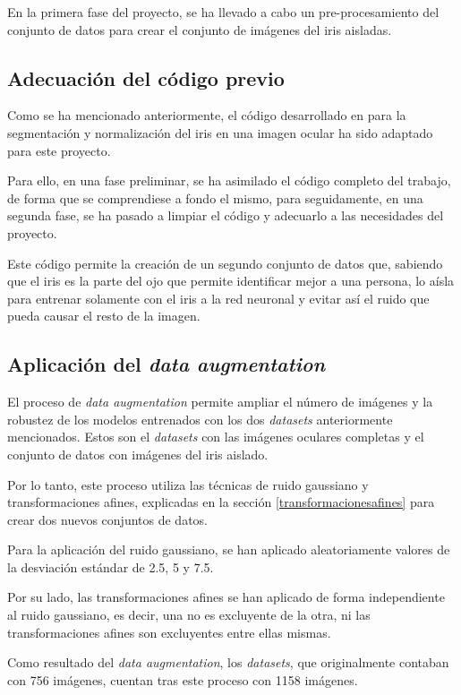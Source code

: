En la primera fase del proyecto, se ha llevado a cabo un pre-procesamiento del conjunto de datos para crear el conjunto de imágenes del iris aisladas.

\subsection{Adecuación del código previo}

Como se ha mencionado anteriormente, el código desarrollado en \cite{tfg_iris_2020} para la segmentación y normalización del iris en una imagen ocular ha sido adaptado para este proyecto. 

Para ello, en una fase preliminar, se ha asimilado el código completo del trabajo, de forma que se comprendiese a fondo el mismo, para seguidamente, en una segunda fase, se ha pasado a limpiar el código y adecuarlo a las necesidades del proyecto. 

Este código permite la creación de un segundo conjunto de datos que, sabiendo que el iris es la parte del ojo que permite identificar mejor a una persona, lo aísla para entrenar solamente con el iris a la red neuronal y evitar así el ruido que pueda causar el resto de la imagen. 

\subsection{Aplicación del \textit{data augmentation}}

El proceso de \textit{data augmentation} permite ampliar el número de imágenes y la robustez de los modelos entrenados con los dos \textit{datasets} anteriormente mencionados. Estos son el \textit{datasets} con las imágenes oculares completas y el conjunto de datos con imágenes del iris aislado. 

Por lo tanto, este proceso utiliza las técnicas de ruido gaussiano y transformaciones afines, explicadas en la sección \ref{transformacionesafines} para crear dos nuevos conjuntos de datos. 

Para la aplicación del ruido gaussiano, se han aplicado aleatoriamente valores de la desviación estándar de 2.5, 5 y 7.5.

Por su lado, las transformaciones afines se han aplicado de forma independiente al ruido gaussiano, es decir, una no es excluyente de la otra, ni las transformaciones afines son excluyentes entre ellas mismas. 

Como resultado del \textit{data augmentation}, los \textit{datasets}, que originalmente contaban con 756 imágenes, cuentan tras este proceso con 1158 imágenes.

